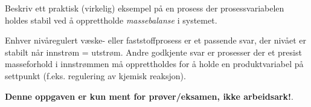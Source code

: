 

Beskriv ett praktisk (virkelig) eksempel på en prosess der prosessvariabelen holdes stabil ved å opprettholde {\it massebalanse} i systemet.

\vskip 50pt







Enhver nivåregulert væske- eller faststoffprosess er et passende svar, der nivået er stabilt når innstrøm = utstrøm. Andre godkjente svar er prosesser der et presist masseforhold i innstrømmen må opprettholdes for å holde en produktvariabel på settpunkt (f.eks. regulering av kjemisk reaksjon).







{\bf Denne oppgaven er kun ment for prøver/eksamen, ikke arbeidsark!}.



